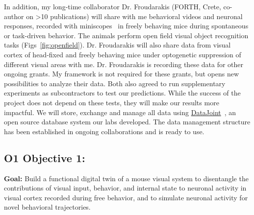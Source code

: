 \documentclass[B2,COG]{ercgrant}
\begin{document}
In addition, my long-time collaborator Dr. Froudarakis (FORTH, Crete, co-author on >10 publications) 
will share with me behavioral videos and neuronal responses, recorded with miniscopes~\parencite[Fig~\ref{fig:miniscope}]{Cai2016-rh} in freely behaving mice during spontaneous or task-driven behavior.
The animals perform open field visual object recognition tasks (Figs~\ref{fig:openfield}). 
Dr. Froudarakis will also share data from visual cortex of head-fixed and freely behaving mice under optogenetic suppression of different visual areas with me. Dr. Froudarakis is recording these data for other ongoing grants. My framework is not required for these grants, but opens new possibilities to analyze their data.
Both also agreed to run supplementary experiments as subcontractors to test our predictions.
While the success of the project does not depend on these tests, they will make our results more impactful.
We will store, exchange and manage all data using \href{https://www.datajoint.org/}{DataJoint}~\parencite{Yatsenko2015-id}, an open source database system our labs developed. 
The data management structure has been established in ongoing collaborations and is ready to use.

\subsection{\colorbox{obj1}{\color{white}O1} Objective 1: \oonetitle}

\textbf{Goal:} Build a functional digital twin of a mouse visual system to disentangle the contributions of visual input, behavior, and internal state to neuronal activity in visual cortex recorded during free behavior, and to simulate neuronal activity for novel behavioral trajectories.
\end{document}
